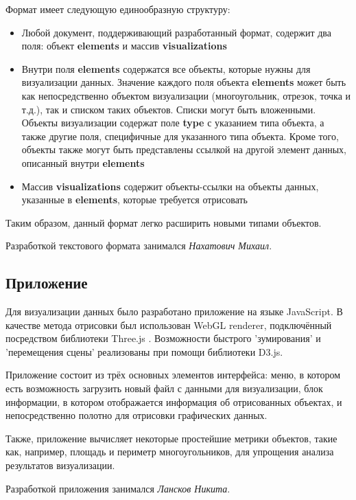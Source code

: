 \documentclass[12pt]{article}
\begin{document}
Формат имеет следующую единообразную структуру: 
\begin{itemize}
	\item Любой документ, поддерживающий разработанный формат, содержит два поля: объект \textbf{elements} и массив \textbf{visualizations}
	\item Внутри поля \textbf{elements} содержатся все объекты, которые нужны для визуализации данных. Значение каждого поля объекта \textbf{elements}  может быть как  непосредственно  объектом визуализации (многоугольник, отрезок, точка и т.д.), так и списком таких объектов. Списки могут быть вложенными. Объекты визуализации содержат поле \textbf{type} с указанием типа объекта, а также другие поля, специфичные для указанного типа объекта. Кроме того, объекты также могут быть представлены ссылкой на другой элемент данных, описанный внутри \textbf{elements}
	\item Массив \textbf{visualizations} содержит объекты-ссылки на объекты данных, указанные в \textbf{elements}, которые требуется отрисовать
\end{itemize}

Таким образом, данный формат легко расширить новыми типами объектов.

Разработкой текстового формата занимался \textit{Нахатович Михаил}.

\subsection{Приложение}

Для визуализации данных было разработано приложение на языке JavaScript. В качестве метода отрисовки был использован WebGL renderer, подключённый посредством библиотеки Three.js \cite{b5}. Возможности быстрого 'зумирования' и 'перемещения сцены' реализованы при помощи библиотеки D3.js\cite{b6}. 

Приложение состоит из трёх основных элементов интерфейса: меню, в котором есть возможность загрузить новый файл с данными для визуализации, блок информации, в котором отображается информация об отрисованных объектах, и непосредственно полотно для отрисовки графических данных. 

Также, приложение вычисляет некоторые простейшие метрики объектов, такие как, например, площадь и периметр многоугольников, для упрощения анализа результатов визуализации.

Разработкой приложения занимался \textit{Лансков Никита}.

\pagebreak
\end{document}
